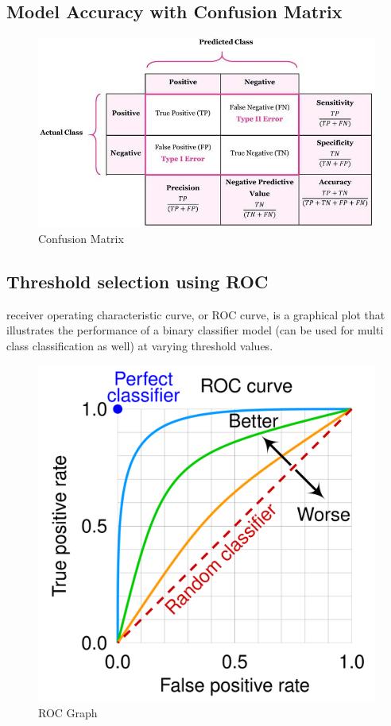 \documentclass[../Main.tex]{subfiles}
\begin{document}
\subsection{Model Accuracy with Confusion Matrix}
\begin{figure}[H]
    \centering
    \includegraphics[width=0.75\linewidth]{Images/conf-matrix.jpg}
    \caption{Confusion Matrix}
\end{figure}

\subsection{Threshold selection using ROC}
receiver operating characteristic curve, or ROC curve,
is a graphical plot that illustrates the performance of a binary classifier model
(can be used for multi class classification as well) at varying threshold values.

\begin{figure}[H]
    \centering
    \includegraphics[width=0.75\linewidth]{Images/roc.png}
    \caption{ROC Graph}
\end{figure}
\end{document}
